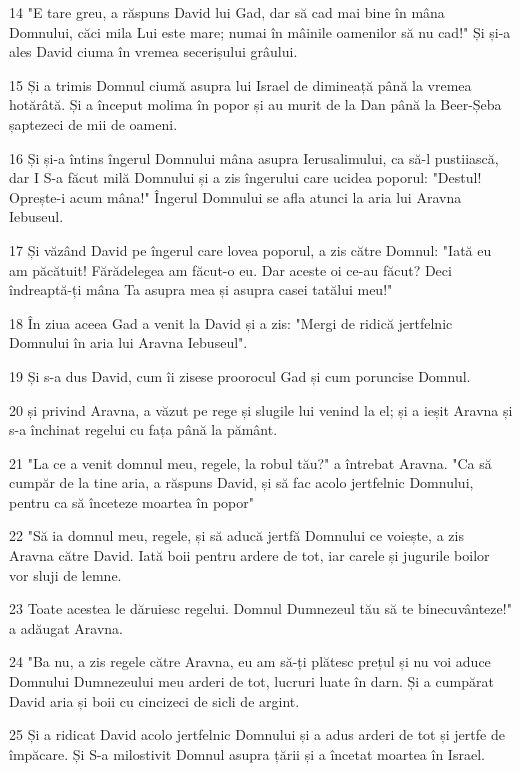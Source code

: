 \par 14 "E tare greu, a răspuns David lui Gad, dar să cad mai bine în mâna Domnului, căci mila Lui este mare; numai în mâinile oamenilor să nu cad!" Și și-a ales David ciuma în vremea secerișului grâului.
\par 15 Și a trimis Domnul ciumă asupra lui Israel de dimineață până la vremea hotărâtă. Și a început molima în popor și au murit de la Dan până la Beer-Șeba șaptezeci de mii de oameni.
\par 16 Și și-a întins îngerul Domnului mâna asupra Ierusalimului, ca să-l pustiiască, dar I S-a făcut milă Domnului și a zis îngerului care ucidea poporul: "Destul! Oprește-i acum mâna!" Îngerul Domnului se afla atunci la aria lui Aravna Iebuseul.
\par 17 Și văzând David pe îngerul care lovea poporul, a zis către Domnul: "Iată eu am păcătuit! Fărădelegea am făcut-o eu. Dar aceste oi ce-au făcut? Deci îndreaptă-ți mâna Ta asupra mea și asupra casei tatălui meu!"
\par 18 În ziua aceea Gad a venit la David și a zis: "Mergi de ridică jertfelnic Domnului în aria lui Aravna Iebuseul".
\par 19 Și s-a dus David, cum îi zisese proorocul Gad și cum poruncise Domnul.
\par 20 și privind Aravna, a văzut pe rege și slugile lui venind la el; și a ieșit Aravna și s-a închinat regelui cu fața până la pământ.
\par 21 "La ce a venit domnul meu, regele, la robul tău?" a întrebat Aravna. "Ca să cumpăr de la tine aria, a răspuns David, și să fac acolo jertfelnic Domnului, pentru ca să înceteze moartea în popor"
\par 22 "Să ia domnul meu, regele, și să aducă jertfă Domnului ce voiește, a zis Aravna către David. Iată boii pentru ardere de tot, iar carele și jugurile boilor vor sluji de lemne.
\par 23 Toate acestea le dăruiesc regelui. Domnul Dumnezeul tău să te binecuvânteze!" a adăugat Aravna.
\par 24 "Ba nu, a zis regele către Aravna, eu am să-ți plătesc prețul și nu voi aduce Domnului Dumnezeului meu arderi de tot, lucruri luate în darn. Și a cumpărat David aria și boii cu cincizeci de sicli de argint.
\par 25 Și a ridicat David acolo jertfelnic Domnului și a adus arderi de tot și jertfe de împăcare. Și S-a milostivit Domnul asupra țării și a încetat moartea în Israel.


